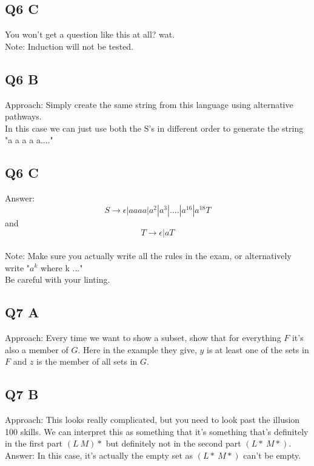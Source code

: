 \documentclass[12pt]{article}
\begin{document}
\subsection*{Q6 C}

You won't get a question like this at all? wat. \\
Note: Induction will not be tested.\\

\subsection*{Q6 B}

Approach: Simply create the same string from this language using alternative pathways. \\
In this case we can just use both the S's in different order to generate the string "a a a a a...." \\

\subsection*{Q6 C}

Answer: $$S \rightarrow \epsilon | aaaa | a^2 | a^3 | .... | a^{16} | a^{18}T$$ and $$T \rightarrow \epsilon | aT$$\\
Note: Make sure you actually write all the rules in the exam, or alternatively write "$a^k$ where k ..."\\
Be careful with your linting.

\subsection*{Q7 A}

Approach: Every time we want to show a subset, show that for everything $F$ it's also a member of $G$. Here in the example they give, $y$ is at least one of the sets in $F$ and $z$ is the member of all sets in $G$.

\subsection*{Q7 B}

Approach: This looks really complicated, but you need to look past the illusion 100 skills. We can interpret this as something that it's something that's definitely in the first part $(L \ M)*$ but definitely not in the second part $(L* \ M*)$. \\

Answer: In this case, it's actually the empty set as $(L* \ M*)$ can't be empty.\\
\end{document}
